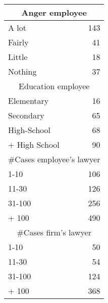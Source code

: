 \begin{tabular}{rr}
\toprule
\multicolumn{2}{c}{Anger employee} \\
\midrule
\midrule
\multicolumn{1}{l}{A lot} & 143 \\
\multicolumn{1}{l}{Fairly} & 41 \\
\multicolumn{1}{l}{Little } & 18 \\
\multicolumn{1}{l}{Nothing} & 37 \\
\midrule
\multicolumn{2}{c}{Education employee} \\
\midrule
\midrule
\multicolumn{1}{l}{Elementary} & 16 \\
\multicolumn{1}{l}{Secondary} & 65 \\
\multicolumn{1}{l}{High-School} & 68 \\
\multicolumn{1}{l}{+ High School} & 90 \\
\midrule
\multicolumn{2}{c}{\#Cases employee's lawyer} \\
\midrule
\midrule
\multicolumn{1}{l}{1-10} & 106 \\
\multicolumn{1}{l}{11-30} & 126 \\
\multicolumn{1}{l}{31-100} & 256 \\
\multicolumn{1}{l}{+ 100} & 490 \\
\midrule
\multicolumn{2}{c}{\#Cases firm's lawyer} \\
\midrule
\midrule
\multicolumn{1}{l}{1-10} & 50 \\
\multicolumn{1}{l}{11-30} & 54 \\
\multicolumn{1}{l}{31-100} & 124 \\
\multicolumn{1}{l}{+ 100} & 368 \\
\bottomrule
\end{tabular}%
